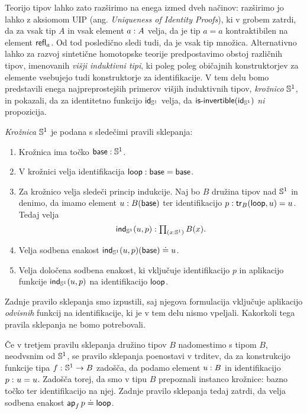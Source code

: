 Teorijo tipov lahko zato razširimo na enega izmed dveh načinov: razširimo jo lahko z aksiomom UIP (ang. \emph{Uniqueness of Identity Proofs}), ki v grobem zatrdi, da za vsak tip \(A\) in vsak element \(a : A\) velja, da je tip \(a = a\) kontraktibilen na element \(\textnormal{\textsf{refl}}_{a}\). Od tod posledično sledi tudi, da je vsak tip množica. Alternativno lahko za razvoj sintetične homotopske teorije predpostavimo obstoj različnih tipov, imenovanih \emph{višji induktivni tipi}, ki poleg poleg običajnih konstruktorjev za elemente vsebujejo tudi konstruktorje za identifikacije. V tem delu bomo predstavili enega najpreprostejših primerov višjih induktivnih tipov, \emph{krožnico} \(\mathbb{S}^{1}\), in pokazali, da za identitetno funkcijo \(\textnormal{\textsf{id}}_{\mathbb{S}^{1}}\) velja, da \(\textnormal{\textsf{is-invertible}}(\textnormal{\textsf{id}}_{\mathbb{S}^{1}})\) \emph{ni} propozicija.

\pagebreak
\begin{definicija}
  \emph{Krožnica} \(\mathbb{S}^{1}\) je podana s sledečimi pravili sklepanja:
  \begin{enumerate}
  \item Krožnica ima točko \(\textnormal{\textsf{base}} : \mathbb{S}^{1}\).
  \item V krožnici velja identifikacija \(\textnormal{\textsf{loop}} : \textnormal{\textsf{base}} = \textnormal{\textsf{base}}\).
  \item Za krožnico velja sledeči princip indukcije. Naj bo \(B\) družina tipov nad \(\mathbb{S}^{1}\) in denimo, da imamo element \(u : B(\textnormal{\textsf{base}})\) ter identifikacijo \(p : \textnormal{\textsf{tr}}_{B}(\textnormal{\textsf{loop}}, u) = u\). Tedaj velja
    \[\textnormal{\textsf{ind}}_{\mathbb{S}^{1}}(u, p) : \textstyle \prod_{\left( x : \mathbb{S}^{1} \right)} B(x).\]
  \item Velja sodbena enakost \(\textnormal{\textsf{ind}}_{\mathbb{S}^{1}}(u, p)(\textnormal{\textsf{base}}) \doteq u\).
  \item Velja določena sodbena enakost, ki vključuje identifikacijo \(p\) in aplikacijo funkcije \(\textnormal{\textsf{ind}}_{\mathbb{S}^{1}}(u, p)\) na identifikacijo \(\textnormal{\textsf{loop}}\).
  \end{enumerate}
\end{definicija}

Zadnje pravilo sklepanja smo izpustili, saj njegova formulacija vključuje aplikacijo \emph{odvisnih} funkcij na identifikacije, ki je v tem delu nismo vpeljali. Kakorkoli tega pravila sklepanja ne bomo potrebovali.

Če v tretjem pravilu sklepanja družino tipov \(B\) nadomestimo s tipom \(B\), neodvsnim od \(\mathbb{S}^{1}\), se pravilo sklepanja poenostavi v trditev, da za konstrukcijo funkcije tipa \(f \,\colon \mathbb{S}^{1} \to B\) zadošča, da podamo element \(u : B\) in identifikacijo \(p \,\colon u = u\). Zadošča torej, da smo v tipu \(B\) prepoznali instanco krožnice: bazno točko ter identifikacijo na njej. Zadnje pravilo sklepanja tedaj zatrdi, da velja sodbena enakost \(\textnormal{\textsf{ap}}_{f}\, p \doteq \textnormal{\textsf{loop}}\).

